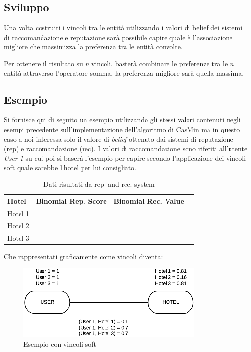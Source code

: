 \documentclass[letterpaper]{article} %
\begin{document}
\hypertarget{header-n240}{%
	\subsection{Sviluppo}\label{header-n240}}

Una volta costruiti i vincoli tra le entità utilizzando i valori di belief dei sistemi di raccomandazione e reputazione sarà possibile capire quale è l'associazione migliore che massimizza la preferenza tra le entità convolte.
\newline

Per ottenere il risultato su \textit{n} vincoli, basterà combinare le preferenze tra le \textit{n} entità attraverso l'operatore somma, la preferenza migliore sarà quella massima. 


\hypertarget{header-n241}{%
	\subsection{Esempio}\label{header-n241}}

Si fornisce qui di seguito un esempio utilizzando gli stessi valori
contenuti negli esempi precedente sull'implementazione dell'algoritmo
di CasMin ma in questo caso a noi interessa solo il valore di
\emph{belief} ottenuto dai sistemi di reputazione (rep) e
raccomandazione (rec). I valori di raccomandazione sono riferiti
all'utente \emph{User 1} su cui poi si baserà l'esempio per capire
secondo l'applicazione dei vincoli soft quale sarebbe l'hotel per lui
consigliato.

\begin{table}[htbp]
	\centering
	\begin{tabular}{| p{1.2cm} | p{1.4cm} | p{1.4cm} | p{1.4cm} |}
		\hline
		\textbf{Hotel} & \textbf{Binomial Rep. Score} & \textbf{Binomial Rec. Value}\\
		\hline
		Hotel 1 & \makecell{$b = 0.81$} & \makecell{$b = 0.1$}\\ \hline
		Hotel 2 & \makecell{$b = 0.16$} & \makecell{$b = 0.7$}\\ \hline
		Hotel 3 & \makecell{$b = 0.81$} & \makecell{$b = 0.7$}\\
		\hline
	\end{tabular}
	\caption[Dati risultati da rep. and rec. system]{Dati risultati da rep. and rec. system}
\end{table}

Che rappresentati graficamente come vincoli diventa:
\begin{center}
\begin{figure}[htbp]
	\centering
	\includegraphics{softcsp-bw.png}
	\caption{Esempio con vincoli soft}
\end{figure}
\end{center}
\end{document}
